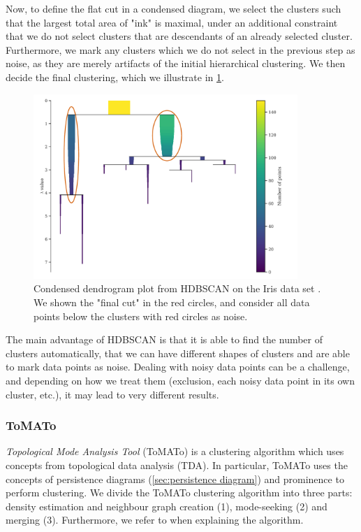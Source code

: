 Now, to define the flat cut in a condensed diagram, we select the clusters such that the largest total area of "ink" is maximal, under an additional constraint that we do not select clusters that are descendants of an already selected cluster. Furthermore, we mark any clusters which we do not select in the previous step as noise, as they are merely artifacts of the initial hierarchical clustering. We then decide the final clustering, which we illustrate in \cref{fig:hdbscan-condensed-dendrogram-final-cut-example}.
\begin{figure}[H]
    \centering
    \includegraphics[width=10cm]{thesis/figures/hdbscan-condensed-tree-final-cut-example.pdf}
    \caption{Condensed dendrogram plot from HDBSCAN on the Iris data set \cite{Fisher1936}. We shown the "final cut" in the red circles, and consider all data points below the clusters with red circles as noise.}
    \label{fig:hdbscan-condensed-dendrogram-final-cut-example}
\end{figure}

The main advantage of HDBSCAN is that it is able to find the number of clusters automatically, that we can have different shapes of clusters and are able to mark data points as noise. Dealing with noisy data points can be a challenge, and depending on how we treat them (exclusion, each noisy data point in its own cluster, etc.), it may lead to very different results.

\subsubsection{ToMATo}
\label{sec:tomato-clustering}
\textit{Topological Mode Analysis Tool} (ToMATo) \cite[2. ToMATo]{Oudot2015} is a clustering algorithm which uses concepts from topological data analysis (TDA). In particular, ToMATo uses the concepts of persistence diagrams (\cref{sec:persistence diagram}) and prominence to perform clustering. We divide the ToMATo clustering algorithm into three parts: density estimation and neighbour graph creation (1), mode-seeking (2) and merging (3). Furthermore, we refer to \cite[2. ToMATo]{Oudot2015} when explaining the algorithm.

